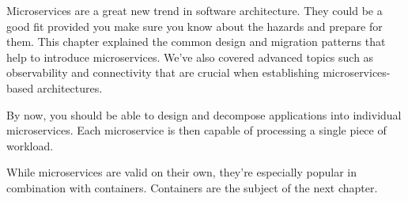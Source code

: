 Microservices are a great new trend in software architecture. They could be a good fit provided you make sure you know about the hazards and prepare for them. This chapter explained the common design and migration patterns that help to introduce microservices. We've also covered advanced topics such as observability and connectivity that are crucial when establishing microservices-based architectures.

By now, you should be able to design and decompose applications into individual microservices. Each microservice is then capable of processing a single piece of workload.

While microservices are valid on their own, they're especially popular in combination with containers. Containers are the subject of the next chapter.
